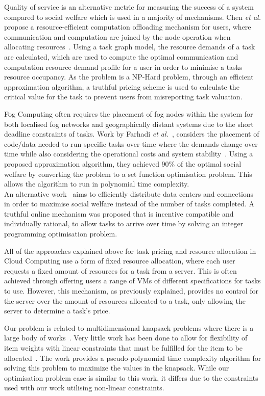 Quality of service is an alternative metric for measuring the success of a system compared to social welfare which is used in a
majority of mechanisms. Chen \emph{et al.} propose a resource-efficient computation offloading mechanism for users, where
communication and computation are joined by the node operation when allocating resources~\cite{8379445}. Using a task
graph model, the resource demands of a task are calculated, which are used to compute the optimal communication and
computation resource demand profile for a user in order to minimise a tasks resource occupancy. As the problem is a
NP-Hard problem, through an efficient approximation algorithm, a truthful pricing scheme is used to calculate the
critical value for the task to prevent users from misreporting task valuation.

Fog Computing often requires the placement of fog nodes within the system for both localised fog networks and
geographically distant systems due to the short deadline constraints of tasks. Work by Farhadi \emph{et al.}~\cite{vaji_infocom}, considers
the placement of code/data needed to run specific tasks over time where the demands change over time while also
considering the operational costs and system stability~\cite{vaji_infocom}. Using a proposed approximation algorithm,
they achieved 90\% of the optimal social welfare by converting the problem to a set function optimisation problem. 
This allows the algorithm to run in polynomial time complexity. \\
An alternative work~\cite{Bi2019} aims to efficiently distribute data centers and connections in order to maximise social
welfare instead of the number of tasks completed. A truthful online mechanism was proposed that is
incentive compatible and individually rational, to allow tasks to arrive over time by solving an integer programming
optimisation problem.

All of the approaches explained above for task pricing and resource allocation in Cloud Computing use a form of fixed
resource allocation, where each user requests a fixed amount of resources for a task from a server. This is often
achieved through offering users a range of VMs of different specifications for tasks to use. However, this mechanism,
as previously explained, provides no control for the server over the amount of resources allocated to a task, only
allowing the server to determine a task's price.

Our problem is related to multidimensional knapsack problems where there is a large body of
works~\cite{knapsacks, numbers}. Very little work has been done to allow for flexibility of item weights with linear
constraints that must be fulfilled for the item to be allocated~\cite{Nip2017}. The work provides a pseudo-polynomial
time complexity algorithm for solving this problem to maximize the values in the knapsack. While our optimisation
problem case is similar to this work, it differs due to the constraints used with our work utilising non-linear constraints.
